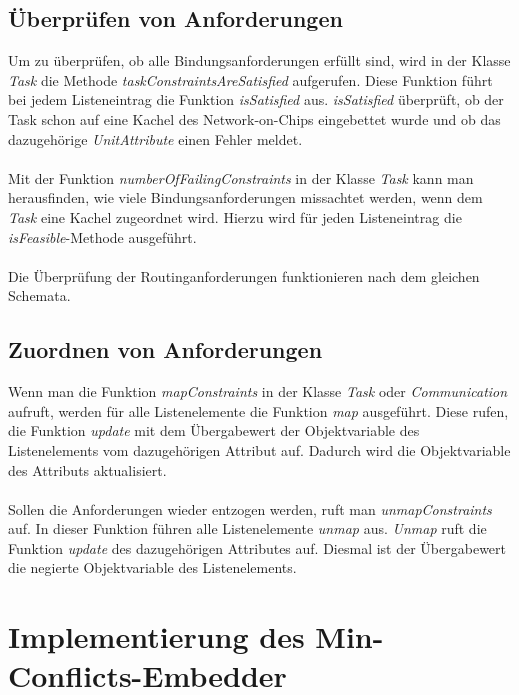 \subsection{Überprüfen von Anforderungen}
Um zu überprüfen, ob alle Bindungsanforderungen erfüllt sind, wird in der Klasse \textit{Task} die Methode \textit{taskConstraintsAreSatisfied} aufgerufen. Diese Funktion führt bei jedem Listeneintrag die Funktion \textit{isSatisfied} aus. \textit{isSatisfied} überprüft, ob der Task schon auf eine Kachel des Network-on-Chips eingebettet wurde und ob das dazugehörige \textit{UnitAttribute} einen Fehler meldet.\\
\\
Mit der Funktion \textit{numberOfFailingConstraints} in der Klasse \textit{Task} kann man herausfinden, wie viele Bindungsanforderungen missachtet werden, wenn dem \textit{Task} eine Kachel zugeordnet wird. Hierzu wird für jeden Listeneintrag die \textit{isFeasible}-Methode ausgeführt.\\
\\
Die Überprüfung der Routinganforderungen funktionieren nach dem gleichen Schemata.

\subsection{Zuordnen  von Anforderungen}
Wenn man die Funktion \textit{mapConstraints} in der Klasse \textit{Task} oder \textit{Communication} aufruft, werden für alle Listenelemente die Funktion \textit{map} ausgeführt. Diese rufen, die Funktion \textit{update} mit dem Übergabewert der Objektvariable des Listenelements vom dazugehörigen Attribut auf. Dadurch wird die Objektvariable des Attributs aktualisiert.\\
\\
Sollen die Anforderungen wieder entzogen werden, ruft man \textit{unmapConstraints} auf. In dieser Funktion führen alle Listenelemente \textit{unmap} aus. \textit{Unmap} ruft die Funktion \textit{update} des dazugehörigen Attributes auf. Diesmal ist der Übergabewert die negierte Objektvariable des Listenelements.



\section{Implementierung des Min-Conflicts-Embedder}\label{minConflictImpl}

